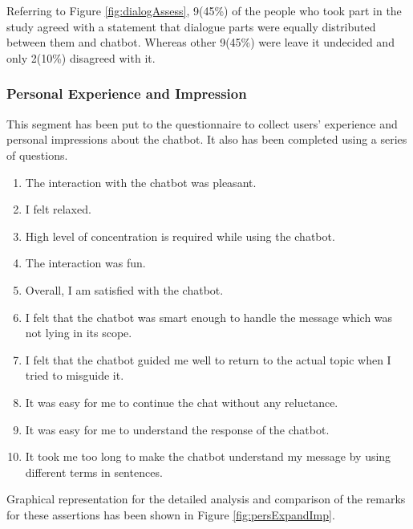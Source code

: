 \\~\\
Referring to Figure \ref{fig:dialogAssess}, 9(45\%) of the people who took part in the study agreed with a statement that dialogue parts were equally distributed between them and chatbot. Whereas other 9(45\%) were leave it undecided and only 2(10\%) disagreed with it.


\subsubsection*{Personal Experience and Impression}
This segment has been put to the questionnaire to collect users' experience and personal impressions about the chatbot. It also has been completed using a series of questions. 
\begin{enumerate}
    \item The interaction with the chatbot was pleasant.
    \item I felt relaxed.
    \item High level of concentration is required while using the chatbot.
    \item The interaction was fun.
    \item Overall, I am satisfied with the chatbot.
    \item I felt that the chatbot was smart enough to handle the message which was not lying in its scope.
    \item I felt that the chatbot guided me well to return to the actual topic when I tried to misguide it.
    \item It was easy for me to continue the chat without any reluctance.
    \item It was easy for me to understand the response of the chatbot.
    \item It took me too long to make the chatbot understand my message by using different terms in sentences.
\end{enumerate}
Graphical representation for the detailed analysis and comparison of the remarks for these assertions has been shown in Figure \ref{fig:persExpandImp}.

